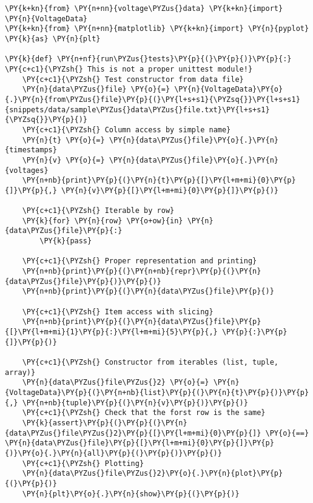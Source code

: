 \begin{Verbatim}[label=\makebox{\url{https://github.com/lucabaldini/cmepda/tree/master/slides/latex/snippets/test\_voltage\_data.py}},commandchars=\\\{\}]
\PY{k+kn}{from} \PY{n+nn}{voltage\PYZus{}data} \PY{k+kn}{import} \PY{n}{VoltageData}
\PY{k+kn}{from} \PY{n+nn}{matplotlib} \PY{k+kn}{import} \PY{n}{pyplot} \PY{k}{as} \PY{n}{plt}

\PY{k}{def} \PY{n+nf}{run\PYZus{}tests}\PY{p}{(}\PY{p}{)}\PY{p}{:} \PY{c+c1}{\PYZsh{} This is not a proper unittest module!}
    \PY{c+c1}{\PYZsh{} Test constructor from data file}
    \PY{n}{data\PYZus{}file} \PY{o}{=} \PY{n}{VoltageData}\PY{o}{.}\PY{n}{from\PYZus{}file}\PY{p}{(}\PY{l+s+s1}{\PYZsq{}}\PY{l+s+s1}{snippets/data/sample\PYZus{}data\PYZus{}file.txt}\PY{l+s+s1}{\PYZsq{}}\PY{p}{)}
    \PY{c+c1}{\PYZsh{} Column access by simple name}
    \PY{n}{t} \PY{o}{=} \PY{n}{data\PYZus{}file}\PY{o}{.}\PY{n}{timestamps}
    \PY{n}{v} \PY{o}{=} \PY{n}{data\PYZus{}file}\PY{o}{.}\PY{n}{voltages}
    \PY{n+nb}{print}\PY{p}{(}\PY{n}{t}\PY{p}{[}\PY{l+m+mi}{0}\PY{p}{]}\PY{p}{,} \PY{n}{v}\PY{p}{[}\PY{l+m+mi}{0}\PY{p}{]}\PY{p}{)}
    
    \PY{c+c1}{\PYZsh{} Iterable by row}
    \PY{k}{for} \PY{n}{row} \PY{o+ow}{in} \PY{n}{data\PYZus{}file}\PY{p}{:}
        \PY{k}{pass}

    \PY{c+c1}{\PYZsh{} Proper representation and printing}
    \PY{n+nb}{print}\PY{p}{(}\PY{n+nb}{repr}\PY{p}{(}\PY{n}{data\PYZus{}file}\PY{p}{)}\PY{p}{)}
    \PY{n+nb}{print}\PY{p}{(}\PY{n}{data\PYZus{}file}\PY{p}{)}

    \PY{c+c1}{\PYZsh{} Item access with slicing}
    \PY{n+nb}{print}\PY{p}{(}\PY{n}{data\PYZus{}file}\PY{p}{[}\PY{l+m+mi}{1}\PY{p}{:}\PY{l+m+mi}{5}\PY{p}{,} \PY{p}{:}\PY{p}{]}\PY{p}{)}

    \PY{c+c1}{\PYZsh{} Constructor from iterables (list, tuple, array)}
    \PY{n}{data\PYZus{}file\PYZus{}2} \PY{o}{=} \PY{n}{VoltageData}\PY{p}{(}\PY{n+nb}{list}\PY{p}{(}\PY{n}{t}\PY{p}{)}\PY{p}{,} \PY{n+nb}{tuple}\PY{p}{(}\PY{n}{v}\PY{p}{)}\PY{p}{)}
    \PY{c+c1}{\PYZsh{} Check that the forst row is the same}
    \PY{k}{assert}\PY{p}{(}\PY{p}{(}\PY{n}{data\PYZus{}file\PYZus{}2}\PY{p}{[}\PY{l+m+mi}{0}\PY{p}{]} \PY{o}{==} \PY{n}{data\PYZus{}file}\PY{p}{[}\PY{l+m+mi}{0}\PY{p}{]}\PY{p}{)}\PY{o}{.}\PY{n}{all}\PY{p}{(}\PY{p}{)}\PY{p}{)}
    \PY{c+c1}{\PYZsh{} Plotting}
    \PY{n}{data\PYZus{}file\PYZus{}2}\PY{o}{.}\PY{n}{plot}\PY{p}{(}\PY{p}{)}
    \PY{n}{plt}\PY{o}{.}\PY{n}{show}\PY{p}{(}\PY{p}{)}
\end{Verbatim}